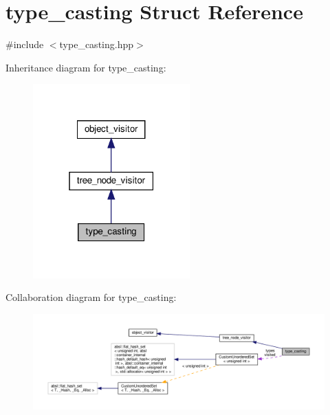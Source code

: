 \hypertarget{structtype__casting}{}\section{type\+\_\+casting Struct Reference}
\label{structtype__casting}


{\ttfamily \#include $<$type\+\_\+casting.\+hpp$>$}



Inheritance diagram for type\+\_\+casting\+:
\nopagebreak
\begin{figure}[H]
\begin{center}
\leavevmode
\includegraphics[width=171pt]{d8/d7e/structtype__casting__inherit__graph}
\end{center}
\end{figure}


Collaboration diagram for type\+\_\+casting\+:
\nopagebreak
\begin{figure}[H]
\begin{center}
\leavevmode
\includegraphics[width=350pt]{de/d03/structtype__casting__coll__graph}
\end{center}
\end{figure}
